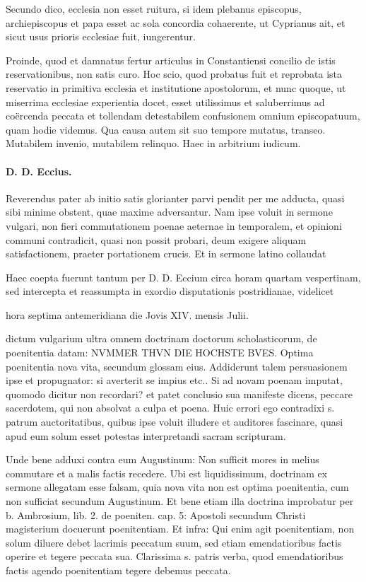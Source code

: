 Secundo dico, ecclesia non esset ruitura, si idem plebanus episcopus, archiepiscopus et papa esset ac sola concordia cohaerente, ut Cyprianus ait, et sicut usus prioris ecclesiae fuit, iungerentur.

Proinde, quod et damnatus fertur articulus in Constantiensi concilio de istis reservationibus, non satis curo. Hoc scio, quod probatus fuit et reprobata ista reservatio in primitiva ecclesia et institutione apostolorum, et nunc quoque, ut miserrima ecclesiae experientia docet, esset utilissimus et saluberrimus ad coërcenda peccata et tollendam detestabilem confusionem omnium episcopatuum, quam hodie videmus. Qua causa autem sit suo tempore mutatus, transeo. Mutabilem invenio, mutabilem relinquo. Haec in arbitrium iudicum.

\marginpar{\small[380]}
\paragraph*{D. D. Eccius.}

Reverendus pater ab initio satis glorianter parvi pendit per me adducta, quasi sibi minime obstent, quae maxime adversantur. Nam ipse voluit in sermone vulgari, non fieri commutationem poenae aeternae in temporalem, et opinioni communi contradicit, quasi non possit probari, deum exigere aliquam satisfactionem, praeter portationem crucis. Et in sermone latino collaudat

Haec coepta fuerunt tantum per D. D. Eccium circa horam quartam vespertinam, sed intercepta et reassumpta in exordio disputationis postridianae, videlicet

hora septima antemeridiana die Jovis XIV. mensis Julii.

dictum vulgarium ultra omnem doctrinam doctorum scholasticorum, de poenitentia datam: NVMMER THVN DIE HOCHSTE BVES. Optima poenitentia nova vita, secundum glossam eius. Addiderunt talem persuasionem ipse et propugnator: si averterit se impius etc.. Si ad novam poenam imputat, quomodo dicitur non recordari? et patet conclusio sua manifeste dicens, peccare sacerdotem, qui non absolvat a culpa et poena. Huic errori ego contradixi s. patrum auctoritatibus, quibus ipse voluit illudere et auditores fascinare, quasi apud eum solum esset potestas interpretandi sacram scripturam.

Unde bene adduxi contra eum Augustinum: Non sufficit mores in melius commutare et a malis factis recedere. Ubi est liquidissimum, doctrinam ex sermone allegatam esse falsam, quia nova vita non est optima poenitentia, cum non sufficiat secundum Augustinum. Et bene etiam illa doctrina improbatur per b. Ambrosium, lib. 2. de poeniten. cap. 5: Apostoli secundum Christi magisterium docuerunt poenitentiam. Et infra: Qui enim agit poenitentiam, non solum diluere debet lacrimis peccatum suum, sed etiam emendatioribus factis operire et tegere peccata sua. Clarissima s. patris verba, quod emendatioribus factis agendo poenitentiam tegere debemus peccata.

